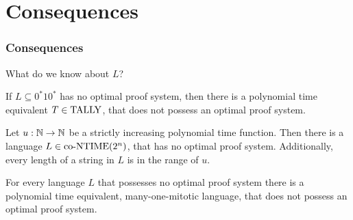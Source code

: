 \section{Consequences} 

\begin{frame}
  \frametitle{Consequences}

  \pause

  What do we know about \(L\)?
  
  \pause
  
  \begin{theorem}
    If \(L \subseteq 0^*10^*\) has no optimal proof system, then there is a polynomial time equivalent \(T \in \text{TALLY}\), that does not possess an optimal proof system.
  \end{theorem}

  \pause
  
  \begin{corollary}
    Let \(u : \mathbb{N} \to \mathbb{N}\) be a strictly increasing polynomial time function. Then there is a language \(L \in \text{co-NTIME}(2^n)\), that has no optimal proof system. Additionally, every length of a string in \(L\) is in the range of \(u\).
  \end{corollary}

  \pause

  \begin{theorem}
    For every language \(L\) that possesses no optimal proof system there is a polynomial time equivalent, many-one-mitotic language, that does not possess an optimal proof system.
  \end{theorem}



\end{frame}
